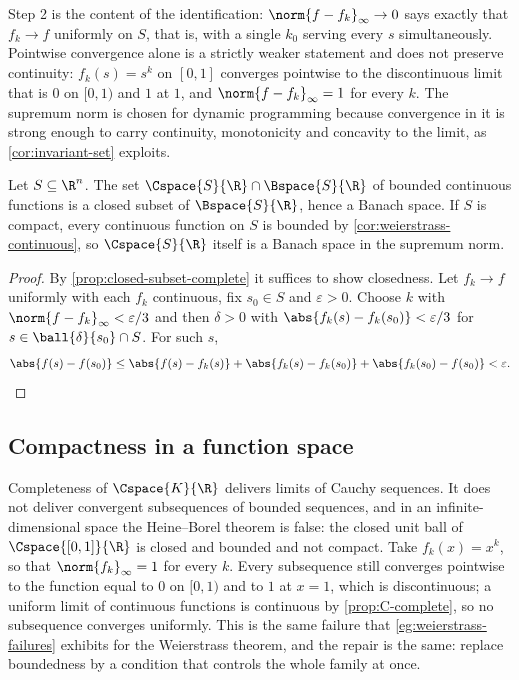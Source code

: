 \begin{remark}
	\label{rem:uniform-convergence}
	Step 2 is the content of the identification: $\norm{f-f_k}_\infty\to0$ says
	exactly that $f_k\to f$ uniformly on $S$, that is, with a single $k_0$ serving
	every $s$ simultaneously. Pointwise convergence alone is a strictly weaker
	statement and does not preserve continuity: $f_k(s)=s^k$ on $[0,1]$ converges
	pointwise to the discontinuous limit that is $0$ on $[0,1)$ and $1$ at $1$, and
	$\norm{f-f_k}_\infty=1$ for every $k$. The supremum norm is chosen for dynamic
	programming because convergence in it is strong enough to carry
	continuity, monotonicity and concavity to the limit, as
	\autoref{cor:invariant-set} exploits.
\end{remark}

\begin{proposition}\label{prop:C-complete}
	Let $S\subseteq\R^n$. The set $\Cspace{S}{\R}\cap\Bspace{S}{\R}$ of bounded
	continuous functions is a closed subset of $\Bspace{S}{\R}$, hence a Banach
	space. If $S$ is compact, every continuous function on $S$ is bounded by
	\autoref{cor:weierstrass-continuous}, so $\Cspace{S}{\R}$ itself is a Banach
	space in the supremum norm.
\end{proposition}

\begin{proof}
	By \autoref{prop:closed-subset-complete} it suffices to show closedness. Let
	$f_k\to f$ uniformly with each $f_k$ continuous, fix $s_0\in S$ and
	$\varepsilon>0$. Choose $k$ with $\norm{f-f_k}_\infty<\varepsilon/3$ and then
	$\delta>0$ with $\abs{f_k(s)-f_k(s_0)}<\varepsilon/3$ for
	$s\in\ball{\delta}{s_0}\cap S$. For such $s$,
	\[
		\abs{f(s)-f(s_0)}\leq\abs{f(s)-f_k(s)}+\abs{f_k(s)-f_k(s_0)}
		+\abs{f_k(s_0)-f(s_0)}<\varepsilon .
	\]
\end{proof}

\subsection{Compactness in a function space}\label{subsec:comp-ascoli}

Completeness of $\Cspace{K}{\R}$ delivers limits of Cauchy sequences. It does not
deliver convergent subsequences of bounded sequences, and in an
infinite-dimensional space the Heine--Borel theorem is false: the closed unit
ball of $\Cspace{[0,1]}{\R}$ is closed and bounded and not compact. Take
$f_k(x)=x^{k}$, so that $\norm{f_k}_\infty=1$ for every $k$. Every subsequence
still converges pointwise to the function equal to $0$ on $[0,1)$ and to $1$ at
$x=1$, which is discontinuous; a uniform limit of continuous functions is
continuous by \autoref{prop:C-complete}, so no subsequence converges
uniformly. This is the same failure that
\autoref{eg:weierstrass-failures} exhibits for the Weierstrass theorem, and the
repair is the same: replace boundedness by a condition that controls the whole
family at once.


